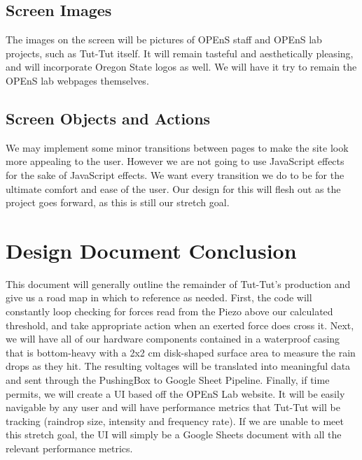 \documentclass[letterpaper,10pt,draftclsnofoot,onecolumn]{article}
\begin{document}
\subsection{Screen Images}
The images on the screen will be pictures of OPEnS staff and OPEnS lab projects, such as Tut-Tut itself. It will remain tasteful and aesthetically pleasing, and will incorporate Oregon State logos as well. We will have it try to remain the OPEnS lab webpages themselves.

\subsection{Screen Objects and Actions}
We may implement some minor transitions between pages to make the site look more appealing to the user. However we are not going to use JavaScript effects for the sake of JavaScript effects. We want every transition we do to be for the ultimate comfort and ease of the user. Our design for this will flesh out as the project goes forward, as this is still our stretch goal.

\pagebreak

\section{Design Document Conclusion}
This document will generally outline the remainder of Tut-Tut's production and give us a road map in which to reference as needed. First, the code will constantly loop checking for forces read from the Piezo above our calculated threshold, and take appropriate action when an exerted force does cross it. Next, we will have all of our hardware components contained in a waterproof casing that is bottom-heavy with a 2x2 cm disk-shaped surface area to measure the rain drops as they hit. The resulting voltages will be translated into meaningful data and sent through the PushingBox to Google Sheet Pipeline. Finally, if time permits, we will create a UI based off the OPEnS Lab website. It will be easily navigable by any user and will have performance metrics that Tut-Tut will be tracking (raindrop size, intensity and frequency rate). If we are unable to meet this stretch goal, the UI will simply be a Google Sheets document with all the relevant performance metrics.
\end{document}
